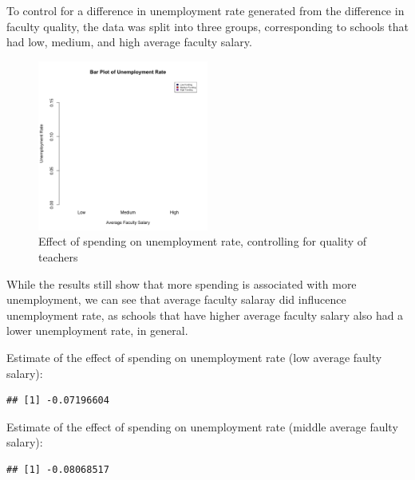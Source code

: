 \documentclass{article}\usepackage[]{graphicx}\usepackage[]{color}
\makeatletter
\newenvironment{kframe}{%
 \def\at@end@of@kframe{}%
 \ifinner\ifhmode%
  \def\at@end@of@kframe{\end{minipage}}%
  \begin{minipage}{\columnwidth}%
 \fi\fi%
 \def\FrameCommand##1{\hskip\@totalleftmargin \hskip-\fboxsep
 \colorbox{shadecolor}{##1}\hskip-\fboxsep
     \hskip-\linewidth \hskip-\@totalleftmargin \hskip\columnwidth}%
 \MakeFramed {\advance\hsize-\width
   \@totalleftmargin\z@ \linewidth\hsize
   \@setminipage}}%
 {\par\unskip\endMakeFramed%
 \at@end@of@kframe}
\newenvironment{knitrout}{}{} %
\makeatother
\begin{document}
To control for a difference in unemployment rate generated from the difference in faculty quality, the data was split into three groups, corresponding to schools that had low, medium, and high average faculty salary.  


\graphicspath{ {../images/} }
\begin{figure}
\centering
\includegraphics[width=0.5\textwidth]{funding}
\caption{Effect of spending on unemployment rate, controlling for quality of teachers}
\end{figure}


While the results still show that more spending is associated with more unemployment, we can see that average faculty salaray did influcence unemployment rate, as schools that have higher average faculty salary also had a lower unemployment rate, in general. 

Estimate of the effect of spending on unemployment rate (low average faulty salary):
\begin{knitrout}
\color{fgcolor}\begin{kframe}
\begin{verbatim}
## [1] -0.07196604
\end{verbatim}
\end{kframe}
\end{knitrout}

Estimate of the effect of spending on unemployment rate (middle average faulty salary):
\begin{knitrout}
\color{fgcolor}\begin{kframe}
\begin{verbatim}
## [1] -0.08068517
\end{verbatim}
\end{kframe}
\end{knitrout}
\end{document}
